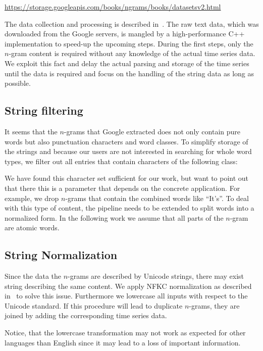 \url{https://storage.googleapis.com/books/ngrams/books/datasetsv2.html}

The data collection and processing is described in~\cite{Google_nGrams}. The raw text data, which was downloaded from the Google servers, is mangled by a high-performance C++ implementation to speed-up the upcoming steps. During the first steps, only the $n$-gram content is required without any knowledge of the actual time series data. We exploit this fact and delay the actual parsing and storage of the time series until the data is required and focus on the handling of the string data as long as possible.


\subsection{String filtering}
\label{ssec:baseline:data:filter}
It seems that the $n$-grams that Google extracted does not only contain pure words but also punctuation characters and word classes. To simplify storage of the strings and because our users are not interested in searching for whole word types, we filter out all entries that contain characters of the following class:

\code{\[\_.\slash{},:;!?\textbackslash'"\#()<>=+*\{\}0-9\]}

We have found this character set sufficient for our work, but want to point out that there this is a parameter that depends on the concrete application. For example, we drop $n$-grams that contain the combined words like \enquote{It's}. To deal with this type of content, the pipeline needs to be extended to split words into a normalized form. In the following work we assume that all parts of the $n$-gram are atomic words.

\subsection{String Normalization}
\label{ssec:baseline:data:snorm}
Since the data the $n$-grams are described by Unicode strings, there may exist string describing the same content. We apply NFKC normalization as described in~\cite{unicode8annex15} to solve this issue. Furthermore we lowercase all inputs with respect to the Unicode standard. If this procedure will lead to duplicate $n$-grams, they are joined by adding the corresponding time series data.

Notice, that the lowercase transformation may not work as expected for other languages than English since it may lead to a loss of important information.



